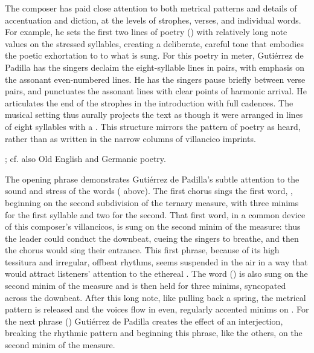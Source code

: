 
The composer has paid close attention to both metrical patterns and details of
accentuation and diction, at the levels of strophes, verses, and individual
words.
For example, he sets the first two lines of poetry () with
relatively long note values on the stressed syllables, creating a deliberate,
careful tone that embodies the poetic exhortation to  to
what is sung.
For this poetry in  meter, Gutiérrez de Padilla has the singers
declaim the eight-syllable lines in pairs, with emphasis on the assonant
even-numbered lines.
He has the singers pause briefly between verse pairs, and punctuates the
assonant lines with clear points of harmonic arrival.
He articulates the end of the strophes in the introduction with full cadences.
The musical setting thus aurally projects the text as though it were arranged
in lines of eight syllables with a .
This structure mirrors the pattern of  poetry as heard, rather
than as written in the narrow columns of villancico imprints.%
\begin{Footnote}
    \Autocites
    {Navarro:Metrica}
    [this structure is used in the ][32--50]
    {MenendezPidal:Crestomatia}; 
    cf. also Old English and Germanic poetry.
\end{Footnote}


The opening phrase demonstrates Gutiérrez de Padilla's subtle attention to the
sound and stress of the words ( above).
The first chorus sings the first word, , beginning on the second
subdivision of the ternary measure, with three minims for the first syllable and
two for the second.
That first word, in a common device of this composer's villancicos, is sung on
the second minim of the measure: thus the leader could conduct the downbeat,
cueing the singers to breathe, and then the chorus would sing their entrance. 
This first phrase, because of its high tessitura and irregular, offbeat rhythms,
seems suspended in the air in a way that would attract listeners' attention to
the ethereal . 
The word  () is also sung on the second minim of the
measure and is then held for three minims, syncopated across the downbeat.
After this long note, like pulling back a spring, the metrical pattern is
released and the voices flow in even, regularly accented minims on .
For the next phrase () Gutiérrez de Padilla
creates the effect of an interjection, breaking the rhythmic pattern and
beginning this phrase, like the others, on the second minim of the measure.


